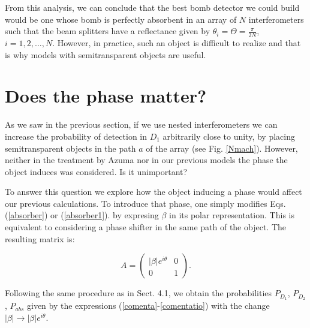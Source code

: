 \documentclass[12pt]{book}
\begin{document}
From this analysis, we can conclude that the best bomb detector we could build would be one whose bomb is perfectly absorbent in an array of $N$ interferometers such that the beam splitters have a reflectance given by $\theta_{i}=\Theta=\frac{\pi}{2 N}$, $i=1,2,\dots,N$. However, in practice, such an object is difficult to realize and that is why models with semitransparent objects are useful.
 

\section{Does the phase matter?}

As we saw in the previous section, if we use nested interferometers we can increase the probability of detection in $D_{1}$ arbitrarily close to unity, by placing semitransparent objects in the path $a$ of the array (see Fig. \ref{Nmach}). However, neither in the treatment by Azuma \cite{Azuma} nor in our previous models the phase the object induces was considered. Is it unimportant?

To answer this question we explore how the object inducing a phase would affect our previous calculations. To introduce that phase, one simply modifies Eqs. (\ref{absorber}) or (\ref{absorber1}). by expresing $\beta$ in its polar representation. This is equivalent to considering a phase shifter in the same path of the object. The resulting matrix is:

\begin{equation}
 A=\begin{pmatrix} |\beta| e^{i \theta}& 0\\0&  1\end{pmatrix}.
 \end{equation}

Following the same procedure as in Sect. 4.1, we obtain the probabilities $P_{D_{1}}$, $P_{D_{2}}$, $P_{abs}$ given by the expressions (\ref{comenta}-\ref{comentatio}) with the change $|\beta|\xrightarrow{}|\beta|e^{i\theta}$.
\end{document}
